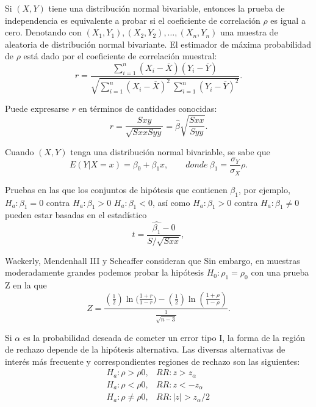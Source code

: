 \documentclass[12pt,letterpaper]{article}
\begin{document}
Si $(X, Y)$ tiene una distribución normal bivariable, entonces la prueba de independencia es equivalente a probar si el coeficiente de correlación $\rho$ es igual a cero. Denotando con $(X_1, Y_1), (X_2, Y_2),\ldots , (X_n, Y_n)$ una muestra de aleatoria de distribución normal bivariante. El estimador de máxima probabilidad de $\rho$ está dado por el coeficiente de correlación muestral:
\begin{equation}
r=\frac{\sum_{i=1}^{n}(X_i-\overline{X})(Y_i-\overline{Y})}{\sqrt{\sum_{i=1}^{n}(X_i-\overline{X})^2\ \sum_{i=1}^{n}(Y_i-\overline{Y})^2}}.
\end{equation}

Puede expresarse $r$ en términos de cantidades conocidas:
\begin{equation}
r=\frac{S{xy}}{\sqrt{S{xx}S{yy}}}=\hat{\beta}\sqrt{\frac{S{xx}}{S{yy}}}.
\end{equation}

Cuando $(X, Y)$ tenga una distribución normal bivariable, se sabe que
\begin{equation}
E(Y|X=x)=\beta_0+\beta_1x,\qquad donde\ \beta_1=\frac{\sigma_Y}{\sigma_X}\rho.
\end{equation}

Pruebas en las que los conjuntos de hipótesis que contienen $\beta_1$, por ejemplo, $H_a\colon \beta_1 = 0$ contra $H_a\colon \beta_1 > 0$ $H_a\colon \beta_1 < 0$, así como $H_a\colon \beta_1 > 0$ contra $H_a\colon \beta_1 \neq 0$ pueden estar basadas en el estadístico
\begin{equation}
t=\frac{\hat{\beta_1}-0}{S/\sqrt{S{xx}}},
\end{equation}

Wackerly, Mendenhall III y Scheaffer consideran que  Sin embargo, en muestras moderadamente grandes podemos probar la hipótesis $H_0\colon \rho_1=\rho_0$ con una prueba Z en la que
\begin{equation}
Z=\frac{(\frac{1}{2})\ln({\frac{1+r}{1-r})}-(\frac{1}{2})\ln(\frac{1+\rho}{1-\rho})}{\frac{1}{\sqrt{n-3}}}.
\end{equation}


Si $\alpha$ es la probabilidad deseada de cometer un error tipo I, la forma de la región de rechazo depende de la hipótesis alternativa. Las diversas alternativas de interés más frecuente y correspondientes regiones de rechazo son las siguientes:
\begin{equation}  
\begin{matrix}
H_a\colon\rho>\rho0, &RR\colon z>z_\alpha\ \ \ \ \ \ \\
H_a\colon\rho<\rho0, &RR\colon z<-z_\alpha\ \ \ \ \\
H_a\colon\rho\neq\rho0, &RR\colon | z | >z_\alpha/2
\end{matrix}
\end{equation}
\end{document}
